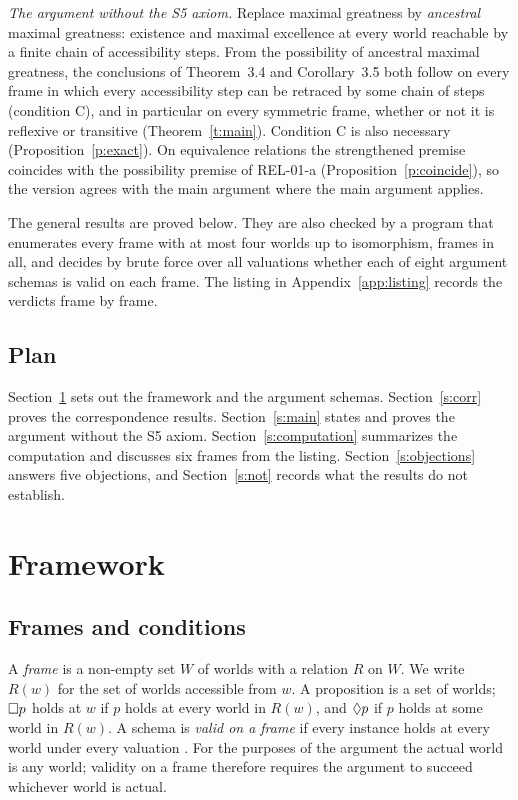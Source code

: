\documentclass{situationist-preprint}
\begin{document}
\emph{The argument without the S5 axiom.} Replace maximal greatness by \emph{ancestral} maximal greatness: existence and maximal excellence at every world reachable by a finite chain of accessibility steps. From the possibility of ancestral maximal greatness, the conclusions of Theorem~3.4 and Corollary~3.5 both follow on every frame in which every accessibility step can be retraced by some chain of steps (condition C), and in particular on every symmetric frame, whether or not it is reflexive or transitive (Theorem~\ref{t:main}). Condition C is also necessary (Proposition~\ref{p:exact}). On equivalence relations the strengthened premise coincides with the possibility premise of REL-01-a (Proposition~\ref{p:coincide}), so the version agrees with the main argument where the main argument applies.

The general results are proved below. They are also checked by a program that enumerates every frame with at most four worlds up to isomorphism, \stTotal{} frames in all, and decides by brute force over all valuations whether each of eight argument schemas is valid on each frame. The listing in Appendix~\ref{app:listing} records the verdicts frame by frame.

\subsection{Plan}

Section~\ref{s:framework} sets out the framework and the argument schemas. Section~\ref{s:corr} proves the correspondence results. Section~\ref{s:main} states and proves the argument without the S5 axiom. Section~\ref{s:computation} summarizes the computation and discusses six frames from the listing. Section~\ref{s:objections} answers five objections, and Section~\ref{s:not} records what the results do not establish.

\section{Framework}\label{s:framework}

\subsection{Frames and conditions}

A \emph{frame} is a non-empty set $W$ of worlds with a relation $R$ on $W$. We write $R(w)$ for the set of worlds accessible from $w$. A proposition is a set of worlds; $\mathord{\Box} p$ holds at $w$ if $p$ holds at every world in $R(w)$, and $\mathord{\Diamond} p$ if $p$ holds at some world in $R(w)$. A schema is \emph{valid on a frame} if every instance holds at every world under every valuation \citep{Kripke1963, HughesCresswell1996}. For the purposes of the argument the actual world is any world; validity on a frame therefore requires the argument to succeed whichever world is actual.
\end{document}
